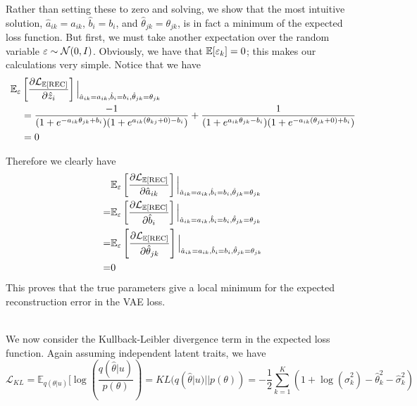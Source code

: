 \documentclass[letterpaper]{article}
\def \e{\ensuremath \varepsilon}
\theoremstyle{definition}
\begin{document}
Rather than setting these to zero and solving, we show that the most intuitive solution, $\hat a_{ik} = a_{ik}$, $\hat b_i = b_i$, and $\hat \theta_{jk} = \theta_{jk}$, is in fact a minimum of the expected loss function. But first, we must take another expectation over the random variable $\e \sim \mathcal{N}(0,I)$. Obviously, we have that $\mathbb{E}[\e_k] = 0$; this makes our calculations very simple. Notice that we have
\begin{align}
  \mathbb{E}_\e &\left[\frac{\partial \mathcal{L}_{\mathbb{E}[\text{REC}]}}{\partial \hat z_i}\right] \Big|_{\hat a_{ik} = a_{ik}, \hat b_i = b_i, \hat \theta_{jk} = \theta_{jk}} \\
  &= \frac{-1}{(1 + e^{-a_{ik}\theta_{jk} + b_i})(1 + e^{a_{ik} (\theta_{kj} + 0) - b_i})} + \frac{1}{(1 + e^{a_{ik}\theta_{jk} - b_i})(1 + e^{-a_{ik}(\theta_{jk} + 0) + b_i})} \\
  &= 0
\end{align}

Therefore we clearly have 
\begin{align}
  &\mathbb{E}_\e \left[\frac{\partial \mathcal{L}_{\mathbb{E}[\text{REC}]}}{\partial \hat a_{ik}}\right] \Big|_{\hat a_{ik} = a_{ik}, \hat b_i = b_i, \hat \theta_{jk} = \theta_{jk}} \\
  = &\mathbb{E}_\e \left[\frac{\partial \mathcal{L}_{\mathbb{E}[\text{REC}]}}{\partial \hat b_i}\right] \Big|_{\hat a_{ik} = a_{ik}, \hat b_i = b_i, \hat \theta_{jk} = \theta_{jk}} \\
  = &\mathbb{E}_\e \left[\frac{\partial \mathcal{L}_{\mathbb{E}[\text{REC}]}}{\partial \hat \theta_{jk}}\right] \Big|_{\hat a_{ik} = a_{ik}, \hat b_i = b_i, \hat \theta_{jk} = \theta_{jk}} \\
  = &0
  \label{solve}
\end{align}
This proves that the true parameters give a local minimum for the expected reconstruction error in the VAE loss. 

\\

We now consider the Kullback-Leibler divergence term in the expected loss function. Again assuming independent latent traits, we have
\begin{equation}
  \mathcal{L}_{KL} = \mathbb{E}_{q(\theta | u)}[\log \left( \frac{q(\hat \theta | u)}{p(\theta)} \right) = KL(q(\hat \theta |u) || p(\theta)) = -\frac{1}{2} \sum_{k=1}^K (1 + \log(\hat \sigma_k^2) - \hat \theta_k^2 - \hat \sigma_k^2)
  \label{eq:kl}
\end{equation}
\end{document}
